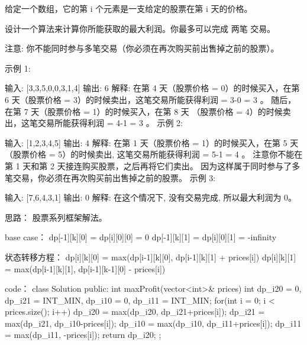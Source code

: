 给定一个数组，它的第 i 个元素是一支给定的股票在第 i 天的价格。

设计一个算法来计算你所能获取的最大利润。你最多可以完成 两笔 交易。

注意: 你不能同时参与多笔交易（你必须在再次购买前出售掉之前的股票）。

示例 1:

输入: [3,3,5,0,0,3,1,4]
输出: 6
解释: 在第 4 天（股票价格 = 0）的时候买入，在第 6 天（股票价格 = 3）的时候卖出，这笔交易所能获得利润 = 3-0 = 3 。
     随后，在第 7 天（股票价格 = 1）的时候买入，在第 8 天 （股票价格 = 4）的时候卖出，这笔交易所能获得利润 = 4-1 = 3 。
示例 2:

输入: [1,2,3,4,5]
输出: 4
解释: 在第 1 天（股票价格 = 1）的时候买入，在第 5 天 （股票价格 = 5）的时候卖出, 这笔交易所能获得利润 = 5-1 = 4 。   
     注意你不能在第 1 天和第 2 天接连购买股票，之后再将它们卖出。   
     因为这样属于同时参与了多笔交易，你必须在再次购买前出售掉之前的股票。
示例 3:

输入: [7,6,4,3,1] 
输出: 0 
解释: 在这个情况下, 没有交易完成, 所以最大利润为 0。































思路：
股票系列框架解法。

base case：
dp[-1][k][0] = dp[i][0][0] = 0
dp[-1][k][1] = dp[i][0][1] = -infinity

状态转移方程：
dp[i][k][0] = max(dp[i-1][k][0], dp[i-1][k][1] + prices[i])
dp[i][k][1] = max(dp[i-1][k][1], dp[i-1][k-1][0] - prices[i])



























code：
class Solution {
public:
    int maxProfit(vector<int>& prices) {
        int dp_i20 = 0, dp_i21 = INT_MIN, dp_i10 = 0, dp_i11 = INT_MIN;
        for(int i = 0; i < prices.size(); i++)
        {
            dp_i20 = max(dp_i20, dp_i21+prices[i]);
            dp_i21 = max(dp_i21, dp_i10-prices[i]);
            dp_i10 = max(dp_i10, dp_i11+prices[i]);
            dp_i11 = max(dp_i11, -prices[i]);
        }
        return dp_i20;
    }
};